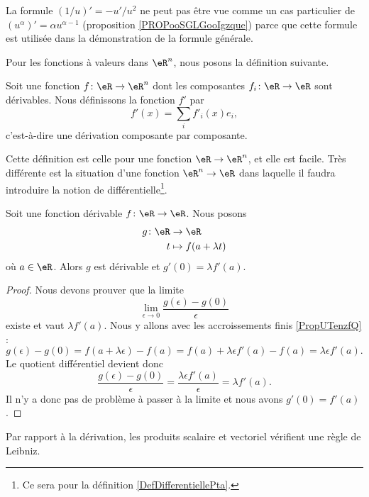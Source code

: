 \begin{remark}
	La formule \( (1/u)'=-u'/u^2\) ne peut pas être vue comme un cas particulier de \( (u^{\alpha})'=\alpha u^{\alpha-1}\) (proposition \ref{PROPooSGLGooIgzque}) parce que cette formule est utilisée dans la démonstration de la formule générale.
\end{remark}


Pour les fonctions à valeurs dans \( \eR^n\), nous posons la définition suivante.
\begin{definition}      \label{DEFooNEPUooWOMpyu}
	Soit une fonction \( f\colon \eR\to \eR^n\) dont les composantes \( f_i\colon \eR\to \eR\) sont dérivables. Nous définissons la fonction \( f'\) par
	\begin{equation}
		f'(x)=\sum_if'_i(x)e_i,
	\end{equation}
	c'est-à-dire une dérivation composante par composante.
\end{definition}

Cette définition est celle pour une fonction \( \eR\to \eR^n\), et elle est facile. Très différente est la situation d'une fonction \( \eR^n\to \eR\) dans laquelle il faudra introduire la notion de différentielle\footnote{Ce sera pour la définition \ref{DefDifferentiellePta}.}.

\begin{lemma}       \label{LEMooXHVBooHYjXdq}
	Soit une fonction dérivable \( f\colon \eR\to \eR\). Nous posons
	\begin{equation}
		\begin{aligned}
			g\colon \eR & \to \eR                \\
			t           & \mapsto f(a+\lambda t)
		\end{aligned}
	\end{equation}
	où \( a\in \eR\). Alors \( g\) est dérivable et \( g'(0)=\lambda  f'(a)\).
\end{lemma}

\begin{proof}
	Nous devons prouver que la limite
	\begin{equation}
		\lim_{\epsilon\to 0}\frac{ g(\epsilon)-g(0) }{ \epsilon }
	\end{equation}
	existe et vaut \( \lambda f'(a)\). Nous y allons avec les accroissements finis \ref{PropUTenzfQ} :
	\begin{equation}
		g(\epsilon)-g(0)=f(a+\lambda \epsilon)-f(a)=f(a)+\lambda \epsilon f'(a)-f(a)=\lambda\epsilon f'(a).
	\end{equation}
	Le quotient différentiel devient donc
	\begin{equation}
		\frac{ g(\epsilon)-g(0) }{ \epsilon }=\frac{ \lambda \epsilon f'(a) }{ \epsilon }=\lambda f'(a).
	\end{equation}
	Il n'y a donc pas de problème à passer à la limite et nous avons \( g'(0)=f'(a)\).
\end{proof}
Par rapport à la dérivation, les produits scalaire et vectoriel vérifient une règle de Leibniz.

